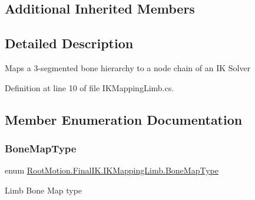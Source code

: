 \subsection*{Additional Inherited Members}


\subsection{Detailed Description}
Maps a 3-\/segmented bone hierarchy to a node chain of an IK Solver 



Definition at line 10 of file I\+K\+Mapping\+Limb.\+cs.



\subsection{Member Enumeration Documentation}
\mbox{\label{class_root_motion_1_1_final_i_k_1_1_i_k_mapping_limb_af0c71500c2436aef8e0a11f5847efdcd}} 
\subsubsection{\texorpdfstring{Bone\+Map\+Type}{BoneMapType}}
{\footnotesize\ttfamily enum \mbox{\hyperlink{class_root_motion_1_1_final_i_k_1_1_i_k_mapping_limb_af0c71500c2436aef8e0a11f5847efdcd}{Root\+Motion.\+Final\+I\+K.\+I\+K\+Mapping\+Limb.\+Bone\+Map\+Type}}\hspace{0.3cm}{\ttfamily [strong]}}



Limb Bone Map type 

